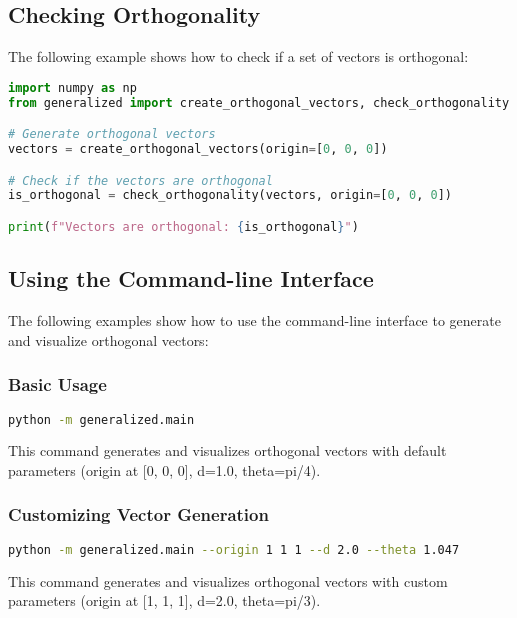 \subsection{Checking Orthogonality}

The following example shows how to check if a set of vectors is orthogonal:

\begin{lstlisting}[language=Python]
import numpy as np
from generalized import create_orthogonal_vectors, check_orthogonality

# Generate orthogonal vectors
vectors = create_orthogonal_vectors(origin=[0, 0, 0])

# Check if the vectors are orthogonal
is_orthogonal = check_orthogonality(vectors, origin=[0, 0, 0])

print(f"Vectors are orthogonal: {is_orthogonal}")
\end{lstlisting}

\subsection{Using the Command-line Interface}

The following examples show how to use the command-line interface to generate and visualize orthogonal vectors:

\subsubsection{Basic Usage}

\begin{lstlisting}[language=bash]
python -m generalized.main
\end{lstlisting}

This command generates and visualizes orthogonal vectors with default parameters (origin at [0, 0, 0], d=1.0, theta=pi/4).

\subsubsection{Customizing Vector Generation}

\begin{lstlisting}[language=bash]
python -m generalized.main --origin 1 1 1 --d 2.0 --theta 1.047
\end{lstlisting}

This command generates and visualizes orthogonal vectors with custom parameters (origin at [1, 1, 1], d=2.0, theta=pi/3).

